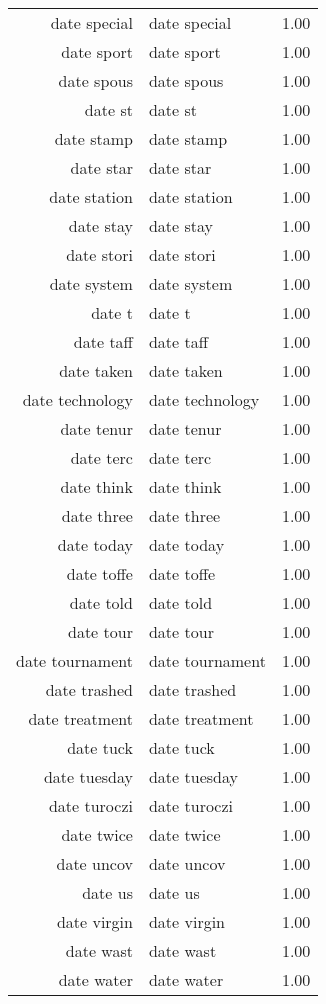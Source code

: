 \begin{table}[ht]
\begin{tabular}{rlr}
  date special & date special & 1.00 \\ 
  date sport & date sport & 1.00 \\ 
  date spous & date spous & 1.00 \\ 
  date st & date st & 1.00 \\ 
  date stamp & date stamp & 1.00 \\ 
  date star & date star & 1.00 \\ 
  date station & date station & 1.00 \\ 
  date stay & date stay & 1.00 \\ 
  date stori & date stori & 1.00 \\ 
  date system & date system & 1.00 \\ 
  date t & date t & 1.00 \\ 
  date taff & date taff & 1.00 \\ 
  date taken & date taken & 1.00 \\ 
  date technology & date technology & 1.00 \\ 
  date tenur & date tenur & 1.00 \\ 
  date terc & date terc & 1.00 \\ 
  date think & date think & 1.00 \\ 
  date three & date three & 1.00 \\ 
  date today & date today & 1.00 \\ 
  date toffe & date toffe & 1.00 \\ 
  date told & date told & 1.00 \\ 
  date tour & date tour & 1.00 \\ 
  date tournament & date tournament & 1.00 \\ 
  date trashed & date trashed & 1.00 \\ 
  date treatment & date treatment & 1.00 \\ 
  date tuck & date tuck & 1.00 \\ 
  date tuesday & date tuesday & 1.00 \\ 
  date turoczi & date turoczi & 1.00 \\ 
  date twice & date twice & 1.00 \\ 
  date uncov & date uncov & 1.00 \\ 
  date us & date us & 1.00 \\ 
  date virgin & date virgin & 1.00 \\ 
  date wast & date wast & 1.00 \\ 
  date water & date water & 1.00 \\ 

\end{tabular}
\end{table}
